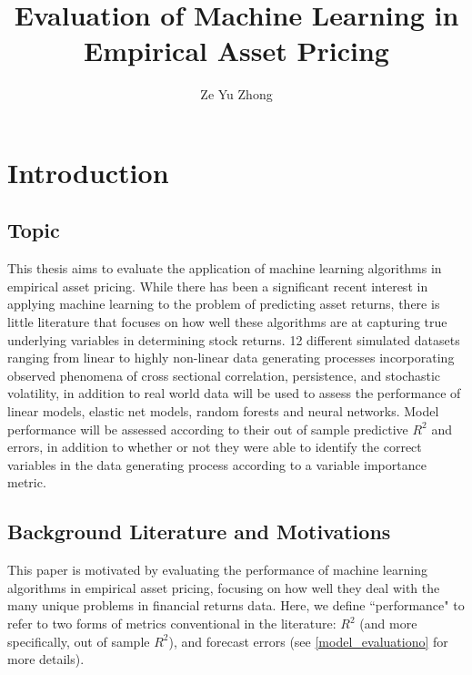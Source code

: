 \documentclass[a4paper, table]{article}
\title{Evaluation of Machine Learning in Empirical Asset Pricing}
\author{Ze Yu Zhong}
\begin{document}
\maketitle

\tableofcontents

\section{Introduction}

\subsection{Topic}

This thesis aims to evaluate the application of machine learning algorithms in empirical asset pricing. While there has been a significant recent interest in applying machine learning to the problem of predicting asset returns, there is little literature that focuses on how well these algorithms are at capturing true underlying variables in determining stock returns. 12 different simulated datasets ranging from linear to highly non-linear data generating processes incorporating observed phenomena of cross sectional correlation, persistence, and stochastic volatility, in addition to real world data will be used to assess the performance of linear models, elastic net models, random forests and neural networks. Model performance will be assessed according to their out of sample predictive $R^2$ and errors, in addition to whether or not they were able to identify the correct variables in the data generating process according to a variable importance metric.

\subsection{Background Literature and Motivations}

This paper is motivated by evaluating the performance of machine learning algorithms in empirical asset pricing, focusing on how well they deal with the many unique problems in financial returns data. Here, we define ``performance" to refer to two forms of metrics conventional in the literature: $R^2$ (and more specifically, out of sample $R^2$), and forecast errors (see \ref{model_evaluationo} for more details).
\end{document}
